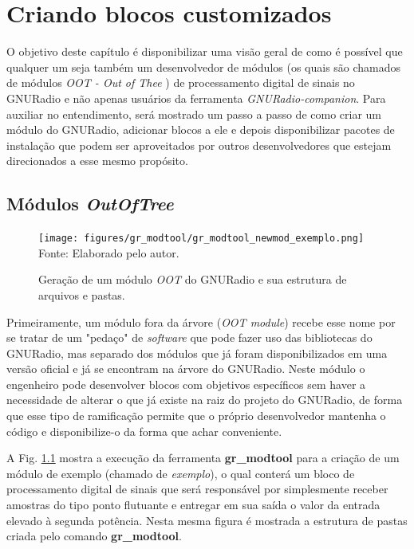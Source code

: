 \documentclass[
  12pt,				%
  openright,			%
  twoside,			%
  a4paper,			%
  english,			%
  french,				%
  spanish,			%
  brazil,				%
  ]{abntex2}
\begin{document}


\chapter{Criando blocos customizados}

O objetivo deste capítulo é disponibilizar uma visão geral de como é possível que qualquer um seja também um desenvolvedor de módulos (os quais são chamados de módulos \textit{OOT - Out of Thee} \cite{GNURADIO-oot-modules})
de processamento digital de sinais no GNURadio e não apenas usuários da ferramenta \textit{GNURadio-companion}. Para auxiliar no entendimento, será mostrado um passo a passo de como criar
um módulo do GNURadio, adicionar blocos a ele e depois disponibilizar pacotes de instalação que podem ser aproveitados por outros desenvolvedores que estejam direcionados a esse mesmo propósito.

\section*{Módulos \textit{OutOfTree}} \label{section:modules_oot}

\begin{figure}[!htb]
  \centering
  \caption{Geração de um módulo \textit{OOT} do GNURadio e sua estrutura de arquivos e pastas.}
  \texttt{[image: figures/gr\_modtool/gr\_modtool\_newmod\_exemplo.png]}
  Fonte: Elaborado pelo autor.
  \label{fig:gr_modtool_newmod_exemplo}
\end{figure}

Primeiramente, um módulo fora da árvore (\textit{OOT module}) recebe esse nome por se tratar de um "pedaço" de \textit{software} que pode fazer uso das bibliotecas do GNURadio, mas separado dos
módulos que já foram disponibilizados em uma versão oficial e já se encontram na árvore do GNURadio. Neste módulo o engenheiro pode desenvolver blocos com objetivos específicos sem haver a necessidade
de alterar o que já existe na raiz do projeto do GNURadio, de forma que esse tipo de ramificação permite que o próprio desenvolvedor mantenha o código e disponibilize-o da forma que achar conveniente.

A Fig. \ref{fig:gr_modtool_newmod_exemplo} mostra a execução da ferramenta \textbf{gr\_modtool} para a criação de um módulo de exemplo (chamado de \textit{exemplo}), o qual conterá um
bloco de processamento digital  de sinais que será responsável por simplesmente receber amostras do tipo ponto flutuante e entregar em sua saída o valor da entrada elevado à segunda potência.
Nesta mesma figura é mostrada a estrutura de pastas criada pelo comando \textbf{gr\_modtool}.
\end{document}
